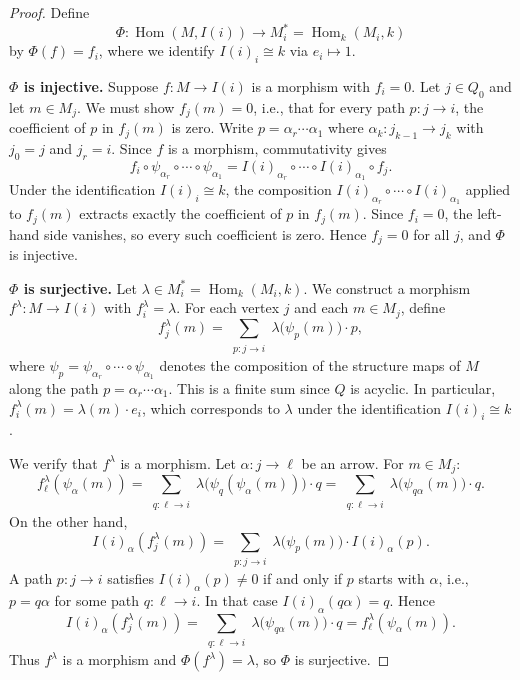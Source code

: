 \documentclass[12pt]{amsart}
\begin{document}
\begin{enumerate}
\begin{proof}
    Define
    \[
    \Phi\colon\operatorname{Hom}(M,I(i))\longrightarrow M_i^*=\operatorname{Hom}_k(M_i,k)
    \]
    by $\Phi(f)=f_i$, where we identify $I(i)_i\cong k$ via $e_i\mapsto 1$.
    
    \medskip\noindent\textbf{$\Phi$ is injective.}
    Suppose $f\colon M\to I(i)$ is a morphism with $f_i=0$. Let $j\in Q_0$ and let $m\in M_j$. We must show $f_j(m)=0$, i.e., that for every path $p\colon j\to i$, the coefficient of $p$ in $f_j(m)$ is zero. Write $p=\alpha_r\cdots\alpha_1$ where $\alpha_k\colon j_{k-1}\to j_k$ with $j_0=j$ and $j_r=i$. Since $f$ is a morphism, commutativity gives
    \[
    f_i\circ\psi_{\alpha_r}\circ\cdots\circ\psi_{\alpha_1} = I(i)_{\alpha_r}\circ\cdots\circ I(i)_{\alpha_1}\circ f_j.
    \]
    Under the identification $I(i)_i\cong k$, the composition $I(i)_{\alpha_r}\circ\cdots\circ I(i)_{\alpha_1}$ applied to $f_j(m)$ extracts exactly the coefficient of $p$ in $f_j(m)$. Since $f_i=0$, the left-hand side vanishes, so every such coefficient is zero. Hence $f_j=0$ for all $j$, and $\Phi$ is injective.
    
    \medskip\noindent\textbf{$\Phi$ is surjective.}
    Let $\lambda\in M_i^*=\operatorname{Hom}_k(M_i,k)$. We construct a morphism $f^\lambda\colon M\to I(i)$ with $f^\lambda_i=\lambda$. For each vertex $j$ and each $m\in M_j$, define
    \[
    f^\lambda_j(m)=\sum_{\substack{p\colon j\to i}} \lambda\bigl(\psi_p(m)\bigr)\cdot p,
    \]
    where $\psi_p=\psi_{\alpha_r}\circ\cdots\circ\psi_{\alpha_1}$ denotes the composition of the structure maps of $M$ along the path $p=\alpha_r\cdots\alpha_1$. This is a finite sum since $Q$ is acyclic. In particular, $f^\lambda_i(m)=\lambda(m)\cdot e_i$, which corresponds to $\lambda$ under the identification $I(i)_i\cong k$.
    
    We verify that $f^\lambda$ is a morphism. Let $\alpha\colon j\to\ell$ be an arrow. For $m\in M_j$:
    \[
    f^\lambda_\ell(\psi_\alpha(m))=\sum_{\substack{q\colon \ell\to i}} \lambda\bigl(\psi_q(\psi_\alpha(m))\bigr)\cdot q
    =\sum_{\substack{q\colon \ell\to i}} \lambda\bigl(\psi_{q\alpha}(m)\bigr)\cdot q.
    \]
    On the other hand,
    \[
    I(i)_\alpha(f^\lambda_j(m))=\sum_{\substack{p\colon j\to i}} \lambda\bigl(\psi_p(m)\bigr)\cdot I(i)_\alpha(p).
    \]
    A path $p\colon j\to i$ satisfies $I(i)_\alpha(p)\neq 0$ if and only if $p$ starts with $\alpha$, i.e., $p=q\alpha$ for some path $q\colon\ell\to i$. In that case $I(i)_\alpha(q\alpha)=q$. Hence
    \[
    I(i)_\alpha(f^\lambda_j(m))=\sum_{\substack{q\colon\ell\to i}} \lambda\bigl(\psi_{q\alpha}(m)\bigr)\cdot q = f^\lambda_\ell(\psi_\alpha(m)).
    \]
    Thus $f^\lambda$ is a morphism and $\Phi(f^\lambda)=\lambda$, so $\Phi$ is surjective.
    

\end{proof}
\end{enumerate}
\end{document}
